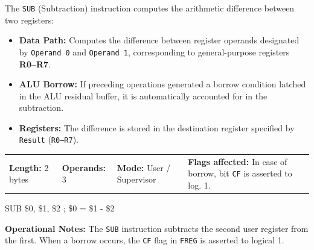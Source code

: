 \documentclass[11pt,a4paper]{article}
\newcommand{\reg}{\$}
\begin{document}
\begin{instructiondesc}[title={Detailed Description and Microcode Semantics}]
The \texttt{SUB} (Subtraction) instruction computes the arithmetic difference between two registers:
\begin{itemize}
    \item \textbf{Data Path:} Computes the difference between register operands designated by \texttt{Operand 0} and \texttt{Operand 1}, corresponding to general-purpose registers \textbf{R0--R7}.
    \item \textbf{ALU Borrow:} If preceding operations generated a borrow condition latched in the ALU residual buffer, it is automatically accounted for in the subtraction.
    \item \textbf{Registers:} The difference is stored in the destination register specified by \texttt{Result} (\texttt{R0--R7}).
\end{itemize}
\end{instructiondesc}

\begin{tcolorbox}[
    enhanced,
    colback=limcard,
    colframe=limborder,
    boxrule=0.6pt,
    arc=3pt,
    left=8pt,right=8pt,top=6pt,bottom=6pt
]
    \footnotesize
    \noindent
    \begin{tabularx}{\textwidth}{@{}l l l X@{}}
        \textbf{Length:} 2 bytes &
        \textbf{Operands:} 3 &
        \textbf{Mode:} User / Supervisor &
        \textbf{Flags affected:} In case of borrow, bit \texttt{CF} is asserted to log. 1.
    \end{tabularx}
\end{tcolorbox}

\begin{examplebox}[title={Usage Example (LIM2 Assembly)}]
\begin{limasm}
SUB  \reg0, \reg1, \reg2     ; \reg0 = \reg1 - \reg2 
\end{limasm}
\vspace{1.5mm}
\footnotesize\color{limmuted}
\textbf{Operational Notes:} The \texttt{SUB} instruction subtracts the second user register from the first. When a borrow occurs, the \texttt{CF} flag in \texttt{FREG} is asserted to logical 1.
\end{examplebox}

\end{document}
